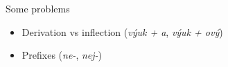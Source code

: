 \documentclass[hyperref={pdfencoding=unicode, unicode=true}, xcolor=dvipsnames]{beamer}
\begin{document}
\begin{frame}{Some problems}
\begin{itemize}
\item Derivation vs inflection (\emph{výuk + a}, \emph{výuk + ový})
\item Prefixes (\emph{ne-}, \emph{nej-})
\end{itemize}
\end{frame}

%

%
%
%
%
%
\end{document}
